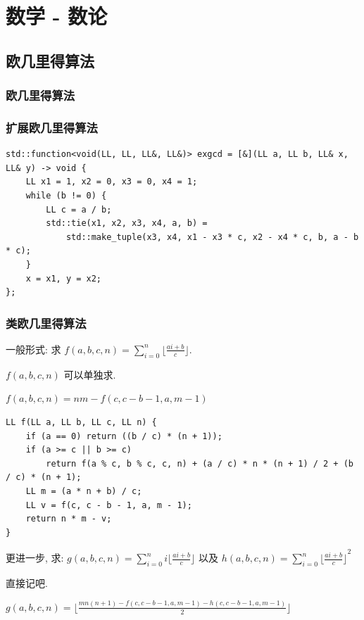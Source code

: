 \documentclass[UTF8, a4paper, titlepage, twoside]{ctexart}
\begin{document}
\newpage
\section{ 数学 - 数论 }

\subsection{ 欧几里得算法 }
\subsubsection{ 欧几里得算法 }
\subsubsection{ 扩展欧几里得算法 }
\begin{lstlisting}
std::function<void(LL, LL, LL&, LL&)> exgcd = [&](LL a, LL b, LL& x, LL& y) -> void {
    LL x1 = 1, x2 = 0, x3 = 0, x4 = 1;
    while (b != 0) {
        LL c = a / b;
        std::tie(x1, x2, x3, x4, a, b) =
            std::make_tuple(x3, x4, x1 - x3 * c, x2 - x4 * c, b, a - b * c);
    }
    x = x1, y = x2;
};
\end{lstlisting}

\subsubsection{ 类欧几里得算法 }
一般形式: 求 $f(a, b, c, n) = \sum\limits_{i = 0}^{n}\lfloor{\frac{ai+b}{c}}\rfloor$.​

$f(a, b, c, n)$ 可以单独求. 

$f(a, b, c, n) = n m - f(c, c - b - 1, a, m - 1)$
\begin{lstlisting}
LL f(LL a, LL b, LL c, LL n) {
    if (a == 0) return ((b / c) * (n + 1));
    if (a >= c || b >= c)
        return f(a % c, b % c, c, n) + (a / c) * n * (n + 1) / 2 + (b / c) * (n + 1);
    LL m = (a * n + b) / c;
    LL v = f(c, c - b - 1, a, m - 1);
    return n * m - v;
}
\end{lstlisting}

更进一步, 求: $g(a, b, c, n) = \sum\limits_{i = 0}^{n}i\lfloor{\frac{ai+b}{c}}\rfloor$ 以及 $h(a, b, c, n) = \sum\limits_{i = 0}^{n}{\lfloor{\frac{ai+b}{c}}\rfloor}^2$

直接记吧. 

$g(a, b, c, n) = \lfloor{\frac{mn(n+1)-f(c, c-b-1, a, m-1)-h(c, c-b-1, a, m-1)}{2}}\rfloor$
\end{document}
